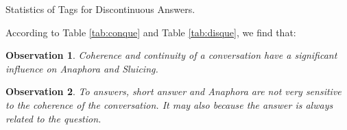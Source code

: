 \documentclass[bsc,frontabs,twoside,singlespacing,parskip,deptreport]{infthesis}     %
\newtheorem{observation}{Observation}[chapter]
\begin{document}
\begin{minipage}{\textwidth}
\begin{minipage}[t]{0.45\textwidth}
        \end{minipage}
        \begin{minipage}[t]{0.45\textwidth}
        \centering
        \makeatletter{}\makeatother
{}
\caption{Statistics of Tags for Discontinuous Answers.}
\label{tab:disans}

        \end{minipage}
    \end{minipage}


According to Table \ref{tab:conque} and Table \ref{tab:disque}, we find that:

\begin{observation}
Coherence and continuity of a conversation have a significant influence on Anaphora and Sluicing.
\end{observation}

\begin{observation}
To answers, short answer and Anaphora are not very sensitive to the coherence of the conversation. It may also because the answer is always related to the question.
\end{observation}
\end{document}
